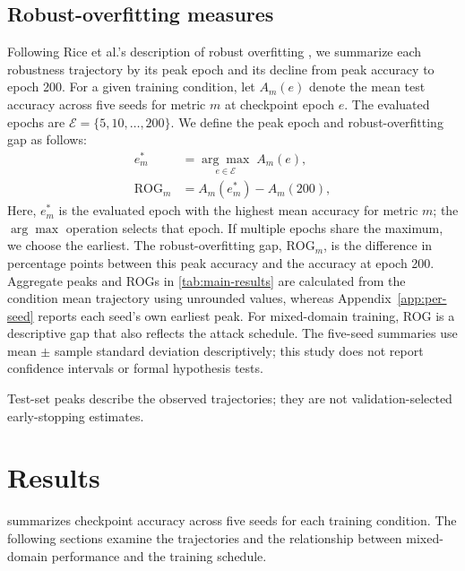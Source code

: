 \documentclass[11pt]{article}
\newcommand{\E}{\mathcal{E}}
\begin{document}
\subsection{Robust-overfitting measures}
\label{sec:overfitting-measures}
Following Rice et al.'s description of robust overfitting \cite{rice2020},
we summarize each robustness trajectory by its peak epoch and its decline
from peak accuracy to epoch 200.
For a given training condition, let $A_m(e)$ denote the mean test accuracy
across five seeds for metric $m$ at checkpoint epoch $e$. The evaluated epochs
are $\E=\{5,10,\ldots,200\}$. We define the peak epoch and robust-overfitting
gap as follows:
\begin{align}
  e_m^* &= \underset{e\in\E}{\arg\max}\;A_m(e), \\
  \mathrm{ROG}_m &= A_m(e_m^*)-A_m(200),
  \label{eq:robust-overfitting-gap}
\end{align}
Here, $e_m^*$ is the evaluated epoch with the highest mean accuracy for
metric $m$; the $\arg\max$ operation selects that epoch. If multiple epochs
share the maximum, we choose the earliest. The robust-overfitting gap,
$\mathrm{ROG}_m$, is the difference in percentage points between this peak
accuracy and the accuracy at epoch 200. Aggregate peaks and ROGs
in \cref{tab:main-results} are calculated
from the condition mean trajectory using unrounded values, whereas
Appendix~\ref{app:per-seed} reports each seed's own earliest peak. For mixed-domain
training, ROG is a descriptive gap that also reflects the attack schedule.
The five-seed summaries use mean $\pm$ sample
standard deviation descriptively; this study does not report confidence
intervals or formal hypothesis tests.

Test-set peaks describe the observed trajectories; they are not
validation-selected early-stopping estimates.

\section{Results}
\label{sec:results}

 summarizes checkpoint accuracy across five seeds for
each training condition. The following sections examine the trajectories and
the relationship between mixed-domain performance and the training schedule.
\end{document}
